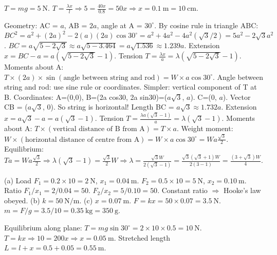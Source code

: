\documentclass[11pt]{article}
\begin{document}
\begin{corrige}[Exercise 7]
$T = mg = 5\ \mathrm{N}$. $T = \frac{\lambda x}{l} \Rightarrow 5 = \frac{40x}{0.8} = 50x \Rightarrow x = 0.1\ \mathrm{m} = 10\ \mathrm{cm}$.
\end{corrige}

\begin{corrige}[Exercise 8]
Geometry: AC = $a$, AB = $2a$, angle at A = $30^\circ$. By cosine rule in triangle ABC:
$BC^2 = a^2 + (2a)^2 - 2(a)(2a)\cos30^\circ = a^2 + 4a^2 - 4a^2(\sqrt{3}/2) = 5a^2 - 2\sqrt{3}a^2$.
$BC = a\sqrt{5 - 2\sqrt{3}} \approx a\sqrt{5-3.464} = a\sqrt{1.536} \approx 1.239a$.
Extension $x = BC - a = a(\sqrt{5-2\sqrt{3}} - 1)$.
Tension $T = \frac{\lambda x}{a} = \lambda(\sqrt{5-2\sqrt{3}} - 1)$.
Moments about A: $T \times (2a) \times \sin(\text{angle between string and rod}) = W \times a \cos30^\circ$.
Angle between string and rod: use sine rule or coordinates. Simpler: vertical component of T at B.
Coordinates: A=(0,0), B=(2a cos30, 2a sin30)=($a\sqrt{3}$, $a$). C=(0, $a$).
Vector CB = ($a\sqrt{3}$, $0$). So string is horizontal! Length BC = $a\sqrt{3} \approx 1.732a$.
Extension $x = a\sqrt{3} - a = a(\sqrt{3}-1)$.
Tension $T = \frac{\lambda a(\sqrt{3}-1)}{a} = \lambda(\sqrt{3}-1)$.
Moments about A: $T \times (\text{vertical distance of B from A}) = T \times a$.
Weight moment: $W \times (\text{horizontal distance of centre from A}) = W \times a\cos30^\circ = W a \frac{\sqrt{3}}{2}$.
Equilibrium: $T a = W a \frac{\sqrt{3}}{2} \Rightarrow \lambda(\sqrt{3}-1) = \frac{\sqrt{3}}{2} W \Rightarrow \lambda = \frac{\sqrt{3} W}{2(\sqrt{3}-1)} = \frac{\sqrt{3}(\sqrt{3}+1)W}{2(3-1)} = \frac{(3+\sqrt{3})W}{4}$.
\end{corrige}

\begin{corrige}[Exercise 9]
(a) Load $F_1 = 0.2 \times 10 = 2\ \mathrm{N}$, $x_1 = 0.04\ \mathrm{m}$. $F_2 = 0.5 \times 10 = 5\ \mathrm{N}$, $x_2 = 0.10\ \mathrm{m}$.
Ratio $F_1/x_1 = 2/0.04 = 50$. $F_2/x_2 = 5/0.10 = 50$. Constant ratio $\Rightarrow$ Hooke's law obeyed.
(b) $k = 50\ \mathrm{N/m}$.
(c) $x = 0.07\ \mathrm{m}$. $F = kx = 50 \times 0.07 = 3.5\ \mathrm{N}$. $m = F/g = 3.5/10 = 0.35\ \mathrm{kg} = 350\ \mathrm{g}$.
\end{corrige}

\begin{corrige}[Exercise 10]
Equilibrium along plane: $T = mg\sin30^\circ = 2 \times 10 \times 0.5 = 10\ \mathrm{N}$.
$T = kx \Rightarrow 10 = 200x \Rightarrow x = 0.05\ \mathrm{m}$.
Stretched length $L = l + x = 0.5 + 0.05 = 0.55\ \mathrm{m}$.
\end{corrige}
\end{document}
